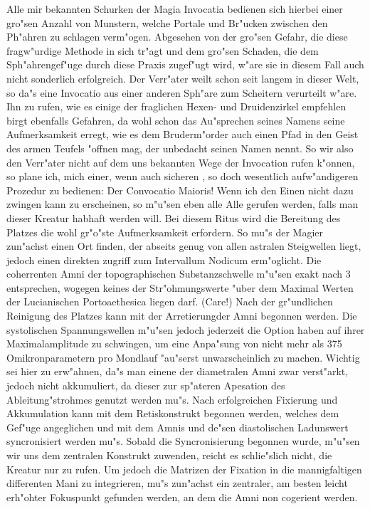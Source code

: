 \documentclass[a5paper,8pt]{book}
\begin{document}
\vspace{10mm}

Alle mir bekannten Schurken der Magia Invocatia bedienen sich hierbei einer gro"sen Anzahl von Munstern, welche Portale und Br"ucken zwischen den Ph"ahren zu schlagen verm"ogen. Abgesehen von der gro"sen Gefahr, die diese fragw"urdige Methode in sich tr"agt und dem gro"sen Schaden, die dem Sph"ahrengef"uge durch diese Praxis zugef"ugt wird, w"are sie in diesem Fall auch nicht sonderlich erfolgreich. Der Verr"ater weilt schon seit langem in dieser Welt, so da"s eine Invocatio aus einer anderen Sph"are zum Scheitern verurteilt w"are.
Ihn zu rufen, wie es einige der fraglichen Hexen- und Druidenzirkel empfehlen birgt ebenfalls Gefahren, da wohl schon das Au"sprechen seines Namens seine Aufmerksamkeit erregt, wie es dem Bruderm"order auch einen Pfad in den Geist des armen Teufels "offnen mag, der unbedacht seinen Namen nennt.
So wir also den Verr"ater nicht auf dem uns bekannten Wege der Invocation rufen k"onnen, so plane ich, mich einer, wenn auch sicheren , so doch wesentlich aufw"andigeren Prozedur zu bedienen:
Der Convocatio Maioris!
Wenn ich den Einen nicht dazu zwingen kann zu erscheinen, so m"u"sen eben alle Alle gerufen werden, falls man dieser Kreatur habhaft werden will.
Bei diesem Ritus wird die Bereitung des Platzes die wohl gr"o"ste Aufmerksamkeit erfordern. So mu"s der Magier zun"achst einen Ort finden, der abseits genug von allen astralen Steigwellen liegt, jedoch einen direkten zugriff zum Intervallum Nodicum erm"oglicht. Die coherrenten Amni der topographischen Substanzschwelle m"u"sen exakt nach 3 entsprechen, wogegen keines der Str"ohmungswerte "uber dem Maximal Werten der Lucianischen Portoaethesica liegen darf. (Care!)
Nach der gr"undlichen Reinigung des Platzes kann mit der Arretierungder Amni begonnen werden.
Die systolischen Spannungswellen m"u"sen jedoch jederzeit die Option haben auf ihrer Maximalamplitude zu schwingen, um eine Anpa"sung von nicht mehr als 375 Omikronparametern pro Mondlauf "au"serst unwarscheinlich zu machen.
Wichtig sei hier zu erw"ahnen, da"s man einene der diametralen Amni zwar verst"arkt, jedoch nicht akkumuliert, da dieser zur sp"ateren Apesation des Ableitung"strohmes genutzt werden mu"s. Nach erfolgreichen Fixierung und Akkumulation kann mit dem Retiskonstrukt begonnen werden, welches dem Gef"uge angeglichen und mit dem Amnis und de"sen diastolischen Ladunswert syncronisiert werden mu"s.
Sobald die Syncronisierung begonnen wurde, m"u"sen wir uns dem zentralen Konstrukt zuwenden, reicht es schlie"slich nicht, die Kreatur nur zu rufen. Um jedoch die Matrizen der Fixation in die mannigfaltigen differenten Mani zu integrieren, mu"s zun"achst ein zentraler, am besten leicht erh"ohter Fokuspunkt gefunden werden, an dem die Amni non cogerient werden.
\end{document}
